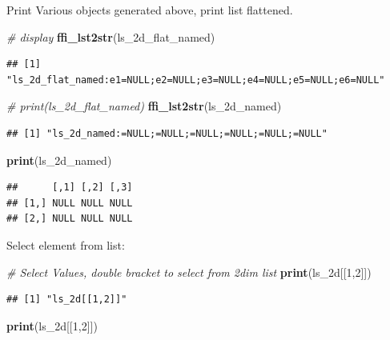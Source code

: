 \documentclass[
]{book}
\newenvironment{Shaded}{\begin{snugshade}}{\end{snugshade}}
\newcommand{\CommentTok}[1]{\textcolor[rgb]{0.56,0.35,0.01}{\textit{#1}}}
\newcommand{\DecValTok}[1]{\textcolor[rgb]{0.00,0.00,0.81}{#1}}
\newcommand{\KeywordTok}[1]{\textcolor[rgb]{0.13,0.29,0.53}{\textbf{#1}}}
\newcommand{\NormalTok}[1]{#1}
\newcommand{\StringTok}[1]{\textcolor[rgb]{0.31,0.60,0.02}{#1}}
\begin{document}
Print Various objects generated above, print list flattened.

\begin{Shaded}
\begin{Highlighting}[]
\CommentTok{\# display}
\KeywordTok{ffi\_lst2str}\NormalTok{(ls\_2d\_flat\_named)}
\end{Highlighting}
\end{Shaded}

\begin{verbatim}
## [1] "ls_2d_flat_named:e1=NULL;e2=NULL;e3=NULL;e4=NULL;e5=NULL;e6=NULL"
\end{verbatim}

\begin{Shaded}
\begin{Highlighting}[]
\CommentTok{\# print(ls\_2d\_flat\_named)}
\KeywordTok{ffi\_lst2str}\NormalTok{(ls\_2d\_named)}
\end{Highlighting}
\end{Shaded}

\begin{verbatim}
## [1] "ls_2d_named:=NULL;=NULL;=NULL;=NULL;=NULL;=NULL"
\end{verbatim}

\begin{Shaded}
\begin{Highlighting}[]
\KeywordTok{print}\NormalTok{(ls\_2d\_named)}
\end{Highlighting}
\end{Shaded}

\begin{verbatim}
##      [,1] [,2] [,3]
## [1,] NULL NULL NULL
## [2,] NULL NULL NULL
\end{verbatim}

Select element from list:

\begin{Shaded}
\begin{Highlighting}[]
\CommentTok{\# Select Values, double bracket to select from 2dim list}
\KeywordTok{print}\NormalTok{(}\StringTok{\textquotesingle{}ls\_2d[[1,2]]\textquotesingle{}}\NormalTok{)}
\end{Highlighting}
\end{Shaded}

\begin{verbatim}
## [1] "ls_2d[[1,2]]"
\end{verbatim}

\begin{Shaded}
\begin{Highlighting}[]
\KeywordTok{print}\NormalTok{(ls\_2d[[}\DecValTok{1}\NormalTok{,}\DecValTok{2}\NormalTok{]])}
\end{Highlighting}
\end{Shaded}
\end{document}

